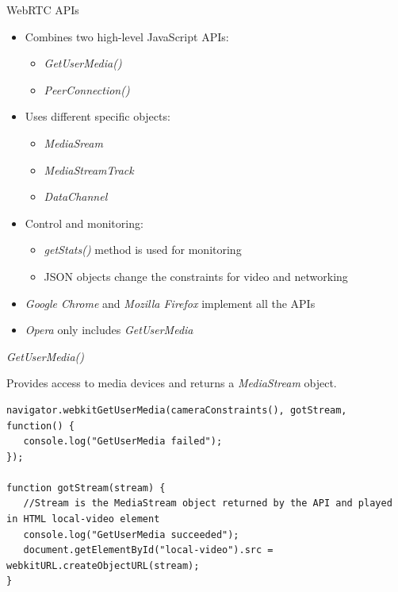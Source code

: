\documentclass[first=red,second=purple,logo=yellowexc]{aaltoslides}
\begin{document}
\begin{frame}{WebRTC APIs}

\begin{itemize}
\item Combines two high-level JavaScript APIs:
\begin{itemize}
\item {\it GetUserMedia()}
\item {\it PeerConnection()}
\end{itemize}
\item Uses different specific objects:
\begin{itemize}
\item {\it MediaSream}
\item {\it MediaStreamTrack}
\item {\it DataChannel}
\end{itemize}
\item Control and monitoring:
\begin{itemize}
\item {\it getStats()} method is used for monitoring
\item JSON objects change the constraints for video and networking
\end{itemize}
\item {\it Google Chrome} and {\it Mozilla Firefox} implement all the APIs
\item {\it Opera} only includes {\it GetUserMedia}
\end{itemize}
\end{frame}


\begin{frame}[fragile]{{\it GetUserMedia()}}

Provides access to media devices and returns a {\it MediaStream} object.

\lstset{language=JavaScript}
\begin{lstlisting}
navigator.webkitGetUserMedia(cameraConstraints(), gotStream, function() {
   console.log("GetUserMedia failed");
});
    
function gotStream(stream) {
   //Stream is the MediaStream object returned by the API and played in HTML local-video element
   console.log("GetUserMedia succeeded");
   document.getElementById("local-video").src = webkitURL.createObjectURL(stream);
}
\end{lstlisting}

\end{frame}
\end{document}
